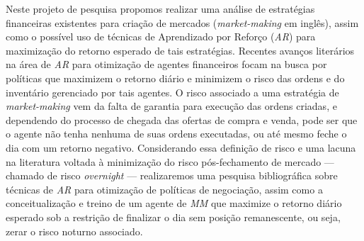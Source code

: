 Neste projeto de pesquisa propomos realizar uma análise de estratégias financeiras existentes para criação de mercados (\textit{market-making} em inglês), assim como o possível uso de técnicas de Aprendizado por Reforço (\textit{AR}) para maximização do retorno esperado de tais estratégias. Recentes avanços literários na área de \textit{AR} para otimização de agentes financeiros focam na busca por políticas que maximizem o retorno diário e minimizem o risco das ordens e do inventário gerenciado por tais agentes. O risco associado a uma estratégia de \textit{market-making} vem da falta de garantia para execução das ordens criadas, e dependendo do processo de chegada das ofertas de compra e venda, pode ser que o agente não tenha nenhuma de suas ordens executadas, ou até mesmo feche o dia com um retorno negativo. Considerando essa definição de risco e uma lacuna na literatura voltada à minimização do risco pós-fechamento de mercado — chamado de risco \textit{overnight} — realizaremos uma pesquisa bibliográfica sobre técnicas de \textit{AR} para otimização de políticas de negociação, assim como a conceitualização e treino de um agente de \textit{MM} que maximize o retorno diário esperado sob a restrição de finalizar o dia sem posição remanescente, ou seja, zerar o risco noturno associado. 
%